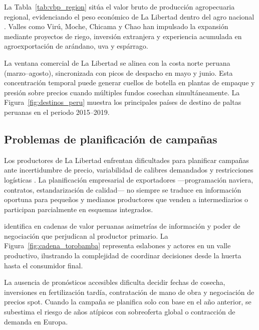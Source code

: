 



La Tabla~\ref{tab:vbp_region} sit\'ua el valor bruto de producci\'on agropecuaria regional, evidenciando el peso econ\'omico de La Libertad dentro del agro nacional \citep{MIDAGRI2025}. Valles como Vir\'u, Moche, Chicama y Chao han impulsado la expansi\'on mediante proyectos de riego, inversi\'on extranjera y experiencia acumulada en agroexportaci\'on de ar\'andano, uva y esp\'arrago.

La ventana comercial de La Libertad se alinea con la costa norte peruana (marzo--agosto), sincronizada con picos de despacho en mayo y junio. Esta concentraci\'on temporal puede generar cuellos de botella en plantas de empaque y presi\'on sobre precios cuando m\'ultiples fundos cosechan simult\'aneamente. La Figura~\ref{fig:destinos_peru} muestra los principales pa\'ises de destino de paltas peruanas en el periodo 2015--2019.


\subsection{Problemas de planificaci\'on de campa\~nas}

Los productores de La Libertad enfrentan dificultades para planificar campa\~nas ante incertidumbre de precio, variabilidad de calibres demandados y restricciones log\'isticas \citep{VargasCordova2025, Capunay2025}. La planificaci\'on empresarial de exportadores ---programaci\'on naviera, contratos, estandarizaci\'on de calidad--- no siempre se traduce en informaci\'on oportuna para peque\~nos y medianos productores que venden a intermediarios o participan parcialmente en esquemas integrados.

\citet{VargasCordova2025} identifica en cadenas de valor peruanas asimetr\'ias de informaci\'on y poder de negociaci\'on que perjudican al productor primario. La Figura~\ref{fig:cadena_torobamba} representa eslabones y actores en un valle productivo, ilustrando la complejidad de coordinar decisiones desde la huerta hasta el consumidor final.


La ausencia de pron\'osticos accesibles dificulta decidir fechas de cosecha, inversiones en fertilizaci\'on tard\'ia, contrataci\'on de mano de obra y negociaci\'on de precios spot. Cuando la campa\~na se planifica solo con base en el a\~no anterior, se subestima el riesgo de a\~nos at\'ipicos con sobreoferta global o contracci\'on de demanda en Europa.

